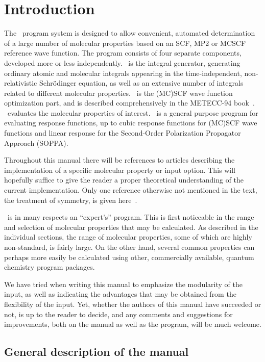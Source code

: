 \chapter{Introduction}\label{ch:intro}

          The \siraba\ program system is designed to allow
convenient, automated determination of a large number of molecular
properties based on an SCF, MP2 or MCSCF reference wave function.  The program 
consists of four separate components, developed more or less
independently. \her\ is the integral generator, generating ordinary
atomic and molecular integrals appearing in
the time-independent, 
non-relativistic Schr\"{o}dinger equation, as well as an extensive number of
integrals related to different molecular properties. \sir\ is the (MC)SCF wave
function optimization part, and is described
comprehensively in the METECC-94 book~\cite{hjajhajomotecc}.
\aba\ evaluates the molecular properties of interest.
\resp\ is a general purpose program for evaluating response functions,
up to cubic response functions for (MC)SCF wave functions and
linear response for the Second-Order Polarization Propagator
Approach (SOPPA).

Throughout this manual there will be references to articles
describing the implementation of a specific molecular property or
input option. This will hopefully suffice to give the reader a proper
theoretical understanding of the current implementation. Only one
reference otherwise not mentioned in the text, the treatment of
symmetry, is given here~\cite{prttca69}. 

\siraba\ is in many respects an ``expert's'' program. This is first
noticeable in the range and selection of molecular properties that may
be calculated. As described in the individual sections, the range of
molecular properties, some of which are highly non-standard, is fairly
large. On the other hand, several common properties can perhaps more
easily be calculated using other, commercially available, quantum
chemistry program packages.

We have tried when writing this manual to emphasize the modularity of
the input, as well as indicating  the advantages that may be obtained from
the flexibility of the input. Yet, whether the authors of
this manual have succeeded or not, is up to the reader to decide, and
any comments and suggestions for improvements, both on the manual as
well as the program, will be much welcome.

\section{General description of the manual}

